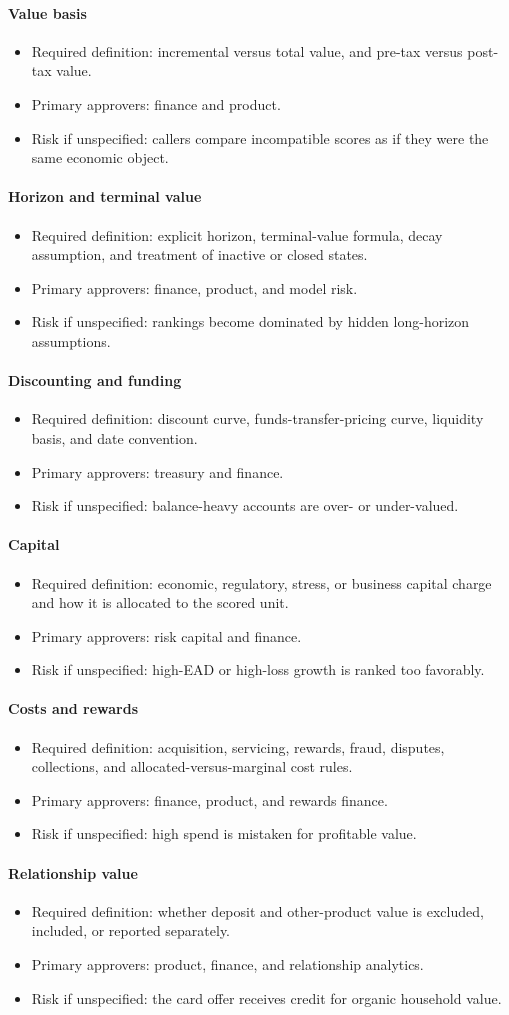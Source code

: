\documentclass[11pt]{article}
\newcommand{\1}{\mathbf{1}}
\newcommand{\contractitem}[2]{\paragraph{#1}\begin{itemize}[leftmargin=1.5em,itemsep=0.12em,topsep=0.18em]#2\end{itemize}}
\begin{document}
\contractitem{Value basis}{
  \item Required definition: incremental versus total value, and pre-tax versus
        post-tax value.
  \item Primary approvers: finance and product.
  \item Risk if unspecified: callers compare incompatible scores as if they
        were the same economic object.
}
\contractitem{Horizon and terminal value}{
  \item Required definition: explicit horizon, terminal-value formula, decay
        assumption, and treatment of inactive or closed states.
  \item Primary approvers: finance, product, and model risk.
  \item Risk if unspecified: rankings become dominated by hidden long-horizon
        assumptions.
}
\contractitem{Discounting and funding}{
  \item Required definition: discount curve, funds-transfer-pricing curve,
        liquidity basis, and date convention.
  \item Primary approvers: treasury and finance.
  \item Risk if unspecified: balance-heavy accounts are over- or under-valued.
}
\contractitem{Capital}{
  \item Required definition: economic, regulatory, stress, or business capital
        charge and how it is allocated to the scored unit.
  \item Primary approvers: risk capital and finance.
  \item Risk if unspecified: high-EAD or high-loss growth is ranked too
        favorably.
}
\contractitem{Costs and rewards}{
  \item Required definition: acquisition, servicing, rewards, fraud, disputes,
        collections, and allocated-versus-marginal cost rules.
  \item Primary approvers: finance, product, and rewards finance.
  \item Risk if unspecified: high spend is mistaken for profitable value.
}
\contractitem{Relationship value}{
  \item Required definition: whether deposit and other-product value is
        excluded, included, or reported separately.
  \item Primary approvers: product, finance, and relationship analytics.
  \item Risk if unspecified: the card offer receives credit for organic
        household value.
}
\end{document}
